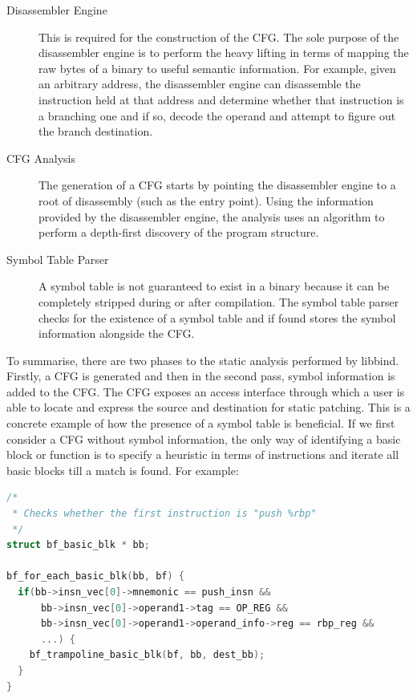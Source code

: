 \begin{description}
\item[Disassembler Engine] This is required for the construction of the CFG. The sole purpose of the disassembler engine is to perform the heavy lifting in terms of mapping the raw bytes of a binary to useful semantic information. For example, given an arbitrary address, the disassembler engine can disassemble the instruction held at that address and determine whether that instruction is a branching one and if so, decode the operand and attempt to figure out the branch destination.
\item[CFG Analysis] The generation of a CFG starts by pointing the disassembler engine to a root of disassembly (such as the entry point). Using the information provided by the disassembler engine, the analysis uses an algorithm to perform a depth-first discovery of the program structure.
\item[Symbol Table Parser] A symbol table is not guaranteed to exist in a binary because it can be completely stripped during or after compilation. The symbol table parser checks for the existence of a symbol table and if found stores the symbol information alongside the CFG.
\end{description}

To summarise, there are two phases to the static analysis performed by libbind. Firstly, a CFG is generated and then in the second pass, symbol information is added to the CFG. The CFG exposes an access interface through which a user is able to locate and express the source and destination for static patching. This is a concrete example of how the presence of a symbol table is beneficial. If we first consider a CFG without symbol information, the only way of identifying a basic block or function is to specify a heuristic in terms of instructions and iterate all basic blocks till a match is found. For example:

\begin{lstlisting}[language=C,caption={Identifying basic blocks via instruction heuristics}]
/*
 * Checks whether the first instruction is "push %rbp"
 */
struct bf_basic_blk * bb;

bf_for_each_basic_blk(bb, bf) {
  if(bb->insn_vec[0]->mnemonic == push_insn &&
      bb->insn_vec[0]->operand1->tag == OP_REG &&
      bb->insn_vec[0]->operand1->operand_info->reg == rbp_reg &&
      ...) {
    bf_trampoline_basic_blk(bf, bb, dest_bb);
  }
}
\end{lstlisting}

